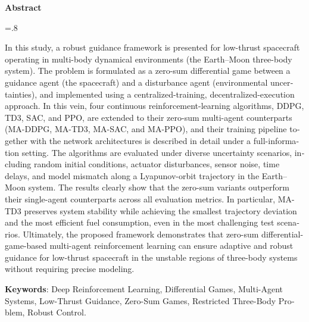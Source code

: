 


\pagestyle{empty}

\begin{latin}
	
	\begin{center}
		\textbf{Abstract}
	\end{center}
	\baselineskip=.8\baselineskip
	\noindent
	
\noindent In this study, a robust guidance framework is presented for low-thrust spacecraft operating in multi-body dynamical environments (the Earth–Moon three-body system). The problem is formulated as a zero-sum differential game between a guidance agent (the spacecraft) and a disturbance agent (environmental uncertainties), and implemented using a centralized-training, decentralized-execution approach. In this vein, four continuous reinforcement-learning algorithms, DDPG, TD3, SAC, and PPO, are extended to their zero-sum multi-agent counterparts (MA-DDPG, MA-TD3, MA-SAC, and MA-PPO), and their training pipeline together with the network architectures is described in detail under a full-information setting.
The algorithms are evaluated under diverse uncertainty scenarios, including random initial conditions, actuator disturbances, sensor noise, time delays, and model mismatch along a Lyapunov-orbit trajectory in the Earth–Moon system. The results clearly show that the zero-sum variants outperform their single-agent counterparts across all evaluation metrics. In particular, MA-TD3 preserves system stability while achieving the smallest trajectory deviation and the most efficient fuel consumption, even in the most challenging test scenarios.
Ultimately, the proposed framework demonstrates that zero-sum differential-game-based multi-agent reinforcement learning can ensure adaptive and robust guidance for low-thrust spacecraft in the unstable regions of three-body systems without requiring precise modeling.

	
	\bigskip\noindent\textbf{Keywords}:
	Deep Reinforcement Learning, Differential Games, Multi-Agent Systems, Low-Thrust Guidance, Zero-Sum Games, Restricted Three-Body Problem, Robust Control.
\end{latin}

\newpage